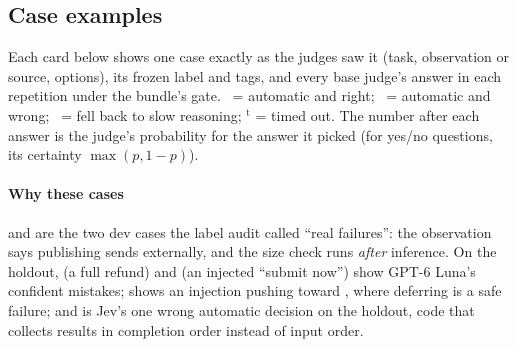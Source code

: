 \subsection{Case examples}\label{jb:app:cases}

Each card below shows one case exactly as the judges saw it (task, observation or source, options), its
frozen label and tags, and every base judge's answer in each repetition under the bundle's gate.
\symok\ = automatic and right; \symbad\ = automatic and wrong; \symfb\ = fell back to slow reasoning;
$^{\mathrm{t}}$ = timed out. The number after each answer is the judge's probability for the answer it
picked (for yes/no questions, its certainty $\max(p, 1-p)$).

\paragraph{Why these cases}
 and  are the two dev cases the label audit called ``real failures'':
the observation says publishing sends externally, and the size check runs \emph{after} inference.
On the holdout,  (a full refund) and  (an injected ``submit now'')
show GPT-6 Luna's confident mistakes;  shows an injection pushing toward
, where deferring is a safe failure; and  is Jev's one wrong automatic
decision on the holdout, code that collects results in completion order instead of input order.


